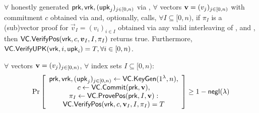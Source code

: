 \ifCameraReady
\begin{definition}[Correctness]
$\forall$ honestly generated $\mathsf{prk},\mathsf{vrk},(\mathsf{upk}_j)_{j\in[0,n)}$ via \ifCameraReady\linebreak[4]\fi\vcsetup, $\forall$ vectors $\bm{\mathrm{v}}=(v_j)_{j\in [0,n)}$ with commitment $c$ obtained via \vccommit and, optionally, \vccommupdate calls, $\forall I\subseteq[0,n)$, if $\pi_I$ is a (sub)vector proof for $\vec{v}_I=(v_i)_{i\in I}$ obtained via any valid interleaving of \vcopenpos, \ifCameraReady\linebreak[4]\fi\vcaggregateproofs and \vcproofupdate, then $\vcverifypos(\vrk, c, \vec{v}_I, I, \pi_I)$ returns true.
Furthermore, $\mathsf{VC}.\mathsf{VerifyUPK}(\mathsf{vrk}, i, \mathsf{upk}_i) = T,\forall i\in[0,n)$.
\end{definition}
\else
\begin{definition}
    \label{def:vc:opening-correctness}
    $\forall$ vectors $\bm{\mathrm{v}}=(v_j)_{j\in [0,n)}$, $\forall$ index sets $I\subseteq[0,n)$:
    \begin{align*}
    \Pr \left[ \begin{array}{c}
    \mathsf{prk},\mathsf{vrk},(\mathsf{upk}_j)_{j\in[0,n)}\leftarrow \mathsf{VC}.\mathsf{KeyGen}(1^\lambda, n), \\
    c \leftarrow \mathsf{VC}.\mathsf{Commit}(\mathsf{prk},\bm{\mathrm{v}}),\\
    \pi_I \leftarrow \mathsf{VC}.\mathsf{ProvePos}(\mathsf{prk}, I, \bm{\mathrm{v}}):\\
    \mathsf{VC}.\mathsf{VerifyPos}(\mathsf{vrk}, c, \bm{\mathrm{v}}_I, I, \pi_I) = T
    \end{array} \right] \ge 1 - \mathsf{negl}(\lambda)
    \end{align*}
\end{definition}


